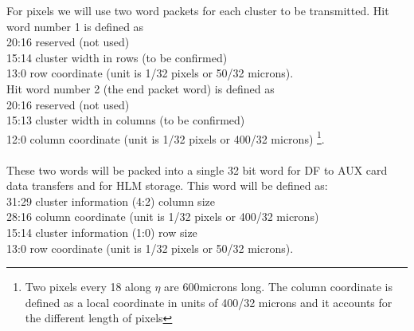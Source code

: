 \documentclass[10pt]{article}
\numberwithin{figure}{section}
\numberwithin{equation}{section}
\numberwithin{table}{section}
\newcommand{\0}{\phantom{0}}
\begin{document}
For pixels we will use two word packets for each cluster to be transmitted.
Hit word number 1 is defined as \\
20:16 reserved (not used) \\
15:14 cluster width in rows (to be confirmed) \\
13:0 row coordinate (unit is 1/32 pixels or 50/32 microns). \\
Hit word number 2 (the end packet word) is defined as \\
20:16 reserved (not used) \\
15:13 cluster width in columns (to be confirmed) \\
12:0 column coordinate (unit is 1/32 pixels or 400/32 microns) \footnote{Two pixels every 18 along $\eta$ are 600microns long. The column coordinate is defined as a local coordinate in units of 400/32 microns and it accounts for the different length of pixels}. \\
\\
These two words will be packed into a single 32 bit word for DF to AUX card data transfers and for HLM storage. This word will be defined as: \\
31:29 cluster information (4:2) column size \\
28:16 column coordinate (unit is 1/32 pixels or 400/32 microns)\\
15:14 cluster information (1:0) row size \\
13:0 row coordinate (unit is 1/32 pixels or 50/32 microns). \\
\end{document}
